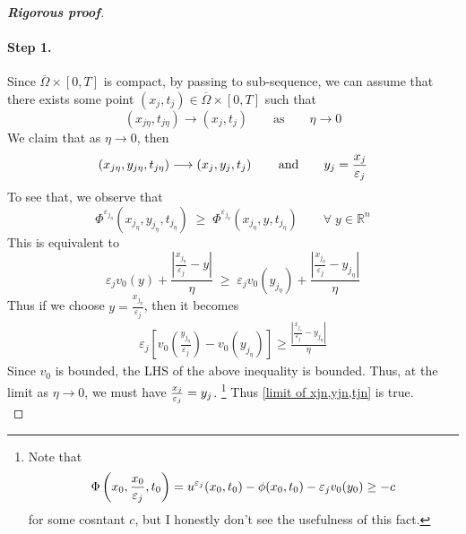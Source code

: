\documentclass[12pt, oneside]{amsart}  	%
\begin{document}
\begin{proof}[\textbf{Rigorous proof}]
\paragraph{\textbf{Step 1.}} Since $\overline{\Omega}\times [0,T]$ is compact, by passing to sub-sequence, we can assume that there exists some point $\left(x_j,t_j\right)\in \overline{\Omega}\times[0,T]$ such that
\begin{equation*}
\left(x_{j\eta},t_{j\eta}\right)\longrightarrow \left(x_j,t_j\right)\qquad\text{as}\qquad \eta\longrightarrow 0
\end{equation*}
We claim that as $\eta\longrightarrow 0$, then 
\begin{equation} \label{limit of xjn,yjn,tjn}
\left(x_{j\eta}, y_{j\eta}, t_{j\eta}\right)\longrightarrow \left(x_j, y_j, t_j\right) \qquad\text{and}\qquad y_j=\frac{x_j}{\varepsilon_j}
\end{equation} 
To see that, we observe that
\begin{equation*}
\Phi^{\varepsilon_{j_\eta}}\left(x_{j_\eta}, y_{j_\eta}, t_{j_\eta}\right) \;\geq\; \Phi^{\varepsilon_{j_\eta}}\left(x_{j_\eta}, y, t_{j_\eta}\right) \qquad\forall \;y \in \mathbb{R}^n
\end{equation*}
This is equivalent to
\begin{equation*}
\varepsilon_j v_0\left(y\right) + \frac{\left|\frac{x_{j_\eta}}{\varepsilon_j} - y\right|}{\eta} \;\geq\; \varepsilon_j v_0\left(y_{j_\eta}\right) + \frac{\left|\frac{x_{j_\eta}}{\varepsilon_j} - y_{j_\eta} \right|}{\eta}
\end{equation*}
Thus if we choose $y = \frac{x_{j_\eta}}{\varepsilon_j}$, then it becomes 
\begin{align*}
\varepsilon_j\left[v_0\left(\frac{y_{j_\eta}}{\varepsilon_j}\right) - v_0\left(y_{j_\eta}\right)\right] \geq \frac{\left|\frac{x_{j_\eta}}{\varepsilon_j} - y_{j_\eta} \right|}{\eta}
\end{align*}
Since $v_0$ is bounded, the LHS of the above inequality is bounded. Thus, at the limit as $\eta \longrightarrow 0$, we must have $\frac{x_j}{\varepsilon_j}=y_j$. \footnote{Note that $$\Phi\left(x_0,\frac{x_0}{\varepsilon_j},t_0\right) =  u^{\varepsilon_j}(x_0, t_0) - \phi(x_0, t_0) - \varepsilon_j v_0(y_0) \geq -c$$ for some cosntant $c$, but I honestly don't see the usefulness of this fact.} Thus \eqref{limit of xjn,yjn,tjn} is true.\\
	

\end{proof}
\end{document}
